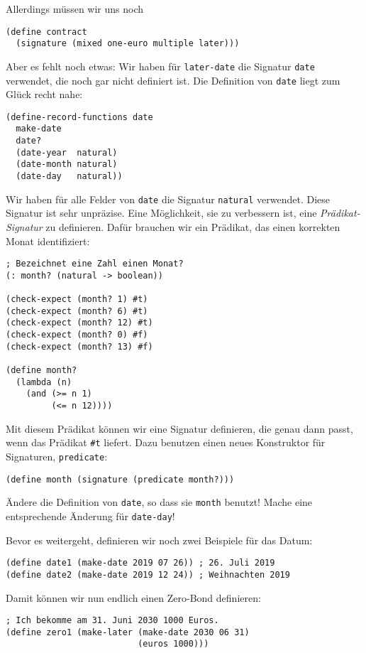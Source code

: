 Allerdings müssen wir uns noch

\begin{lstlisting}
(define contract
  (signature (mixed one-euro multiple later)))
\end{lstlisting}
%
Aber es fehlt noch etwas: Wir haben für \lstinline{later-date} die
Signatur \lstinline{date} verwendet, die noch gar nicht definiert ist.
Die Definition von \texttt{date} liegt zum Glück recht nahe:
%
\begin{lstlisting}
(define-record-functions date
  make-date
  date?
  (date-year  natural)
  (date-month natural)
  (date-day   natural))
\end{lstlisting}
%
\begin{aufgabe}
  Wir haben für alle Felder von \lstinline{date} die Signatur
  \lstinline{natural} verwendet. Diese Signatur ist sehr unpräzise.
  Eine Möglichkeit, sie zu verbessern ist, eine
  \textit{Prädikat-Signatur} zu definieren.
  Dafür brauchen wir ein Prädikat, das einen korrekten Monat
  identifiziert:
\begin{lstlisting}
; Bezeichnet eine Zahl einen Monat?
(: month? (natural -> boolean))

(check-expect (month? 1) #t)
(check-expect (month? 6) #t)
(check-expect (month? 12) #t)
(check-expect (month? 0) #f)
(check-expect (month? 13) #f)

(define month?
  (lambda (n)
    (and (>= n 1)
         (<= n 12))))  
\end{lstlisting}
  Mit diesem Prädikat können wir eine Signatur definieren, die genau
  dann passt, wenn das Prädikat \lstinline{#t} liefert.  Dazu benutzen
  einen neues Konstruktor für Signaturen, \lstinline{predicate}:
\begin{lstlisting}
(define month (signature (predicate month?)))
\end{lstlisting}
%
  Ändere die Definition von \lstinline{date}, so dass sie
  \lstinline{month} benutzt!  Mache eine entsprechende Änderung für
  \lstinline{date-day}!
\end{aufgabe}
%
Bevor es weitergeht, definieren wir noch zwei Beispiele für das Datum:
%
\begin{lstlisting}
(define date1 (make-date 2019 07 26)) ; 26. Juli 2019
(define date2 (make-date 2019 12 24)) ; Weihnachten 2019
\end{lstlisting}
%
Damit können wir nun endlich einen Zero-Bond definieren:
%
\begin{lstlisting}
; Ich bekomme am 31. Juni 2030 1000 Euros.
(define zero1 (make-later (make-date 2030 06 31)
                          (euros 1000)))
\end{lstlisting}

